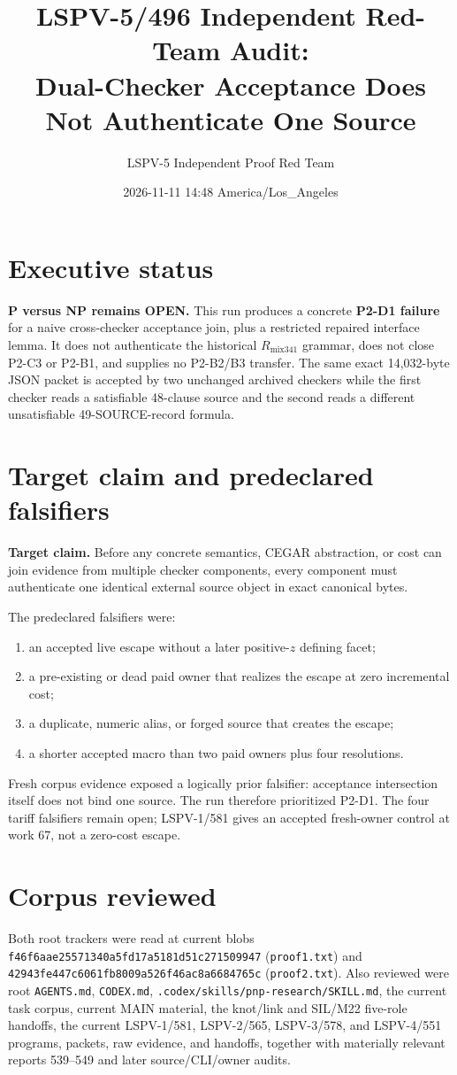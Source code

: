 \documentclass[11pt]{article}
\title{LSPV-5/496 Independent Red-Team Audit:\\
Dual-Checker Acceptance Does Not Authenticate One Source}
\author{LSPV-5 Independent Proof Red Team}
\date{2026-11-11 14:48 America/Los\_Angeles}
\begin{document}
\maketitle

\section*{Executive status}
\textbf{P versus NP remains OPEN.}
This run produces a concrete \textbf{P2-D1 failure} for a naive
cross-checker acceptance join, plus a restricted repaired interface lemma.
It does not authenticate the historical \(R_{\mathrm{mix341}}\) grammar,
does not close P2-C3 or P2-B1, and supplies no P2-B2/B3 transfer.
The same exact 14,032-byte JSON packet is accepted by two unchanged archived
checkers while the first checker reads a satisfiable 48-clause source and the
second reads a different unsatisfiable 49-SOURCE-record formula.

\section*{Target claim and predeclared falsifiers}
\textbf{Target claim.}
Before any concrete semantics, CEGAR abstraction, or cost can join evidence
from multiple checker components, every component must authenticate one
identical external source object in exact canonical bytes.

The predeclared falsifiers were:
\begin{enumerate}
\item an accepted live escape without a later positive-\(z\) defining facet;
\item a pre-existing or dead paid owner that realizes the escape at zero
incremental cost;
\item a duplicate, numeric alias, or forged source that creates the escape;
\item a shorter accepted macro than two paid owners plus four resolutions.
\end{enumerate}
Fresh corpus evidence exposed a logically prior falsifier: acceptance
intersection itself does not bind one source. The run therefore prioritized
P2-D1. The four tariff falsifiers remain open; LSPV-1/581 gives an accepted
fresh-owner control at work 67, not a zero-cost escape.

\section*{Corpus reviewed}
Both root trackers were read at current blobs
\texttt{f46f6aae25571340a5fd17a5181d51c271509947} (\texttt{proof1.txt}) and
\texttt{42943fe447c6061fb8009a526f46ac8a6684765c} (\texttt{proof2.txt}).
Also reviewed were root \texttt{AGENTS.md}, \texttt{CODEX.md},
\texttt{.codex/skills/pnp-research/SKILL.md}, the current task corpus,
current MAIN material, the knot/link and SIL/M22 five-role handoffs, the
current LSPV-1/581, LSPV-2/565, LSPV-3/578, and LSPV-4/551 programs,
packets, raw evidence, and handoffs, together with materially relevant
reports 539--549 and later source/CLI/owner audits.
\end{document}

